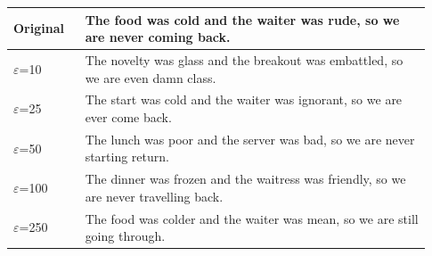 \begin{tabular}{@{}p{0.16\linewidth}p{0.77\linewidth}@{}}
\toprule
Original & The food was cold and the waiter was rude, so we are never coming back. \\
\midrule
$\varepsilon$=10 & The novelty was glass and the breakout was embattled, so we are even damn class. \\
$\varepsilon$=25 & The start was cold and the waiter was ignorant, so we are ever come back. \\
$\varepsilon$=50 & The lunch was poor and the server was bad, so we are never starting return. \\
$\varepsilon$=100 & The dinner was frozen and the waitress was friendly, so we are never travelling back. \\
$\varepsilon$=250 & The food was colder and the waiter was mean, so we are still going through. \\
\bottomrule
\end{tabular}
